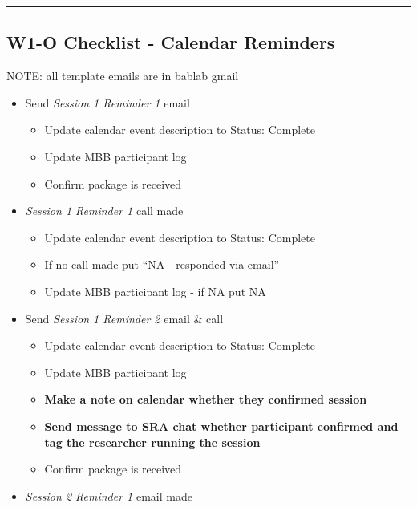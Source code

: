 \documentclass[
]{book}
\providecommand{\tightlist}{%
  \setlength{\itemsep}{0pt}\setlength{\parskip}{0pt}}
\begin{document}
\begin{center}\rule{0.5\linewidth}{0.5pt}\end{center}

\hypertarget{w1-o-checklist---calendar-reminders}{%
\subsection{W1-O Checklist - Calendar Reminders}\label{w1-o-checklist---calendar-reminders}}

NOTE: all template emails are in bablab gmail

\begin{itemize}
\tightlist
\item
  Send \emph{Session 1 Reminder 1} email

  \begin{itemize}
  \tightlist
  \item
    Update calendar event description to Status: Complete
  \item
    Update MBB participant log
  \item
    Confirm package is received
  \end{itemize}
\item
  \emph{Session 1 Reminder 1} call made

  \begin{itemize}
  \tightlist
  \item
    Update calendar event description to Status: Complete
  \item
    If no call made put ``NA - responded via email''
  \item
    Update MBB participant log - if NA put NA
  \end{itemize}
\item
  Send \emph{Session 1 Reminder 2} email \& call

  \begin{itemize}
  \tightlist
  \item
    Update calendar event description to Status: Complete
  \item
    Update MBB participant log
  \item
    \textbf{Make a note on calendar whether they confirmed session}
  \item
    \textbf{Send message to SRA chat whether participant confirmed and tag the researcher running the session}
  \item
    Confirm package is received
  \end{itemize}
\item
  \emph{Session 2 Reminder 1} email made


\end{itemize}
\end{document}
